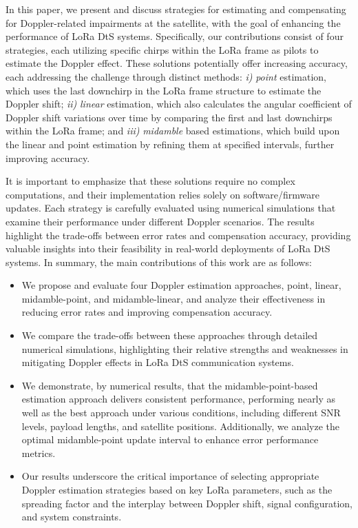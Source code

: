 \documentclass{IEEEtran}
\begin{document}
In this paper, we present and discuss strategies for estimating and compensating for Doppler-related impairments at the satellite, with the goal of enhancing the performance of \ac{LoRa} \ac{DtS} systems. Specifically, our contributions consist of four strategies, each utilizing specific chirps within the \ac{LoRa} frame as pilots to estimate the Doppler effect. These solutions potentially offer increasing accuracy, each addressing the challenge through distinct methods: \textit{i)} \emph{point} estimation, which uses the last downchirp in the \ac{LoRa} frame structure to estimate the Doppler shift; \textit{ii)} \emph{linear} estimation, which also calculates the angular coefficient of Doppler shift variations over time by comparing the first and last  downchirps within the \ac{LoRa} frame; and \textit{iii)} \emph{midamble} based estimations, which build upon the linear and point estimation by refining them at specified intervals, further improving accuracy.

It is important to emphasize that these solutions require no complex computations, and their implementation relies solely on software/firmware updates. Each strategy is carefully evaluated using numerical simulations that examine their performance under different Doppler scenarios. The results highlight the trade-offs between error rates and compensation accuracy, providing valuable insights into their feasibility in real-world deployments of \ac{LoRa} \ac{DtS} systems. In summary, the main contributions of this work are as follows: 
\begin{itemize} 
    \item We propose and evaluate four Doppler estimation approaches, point, linear, midamble-point, and midamble-linear, and analyze their effectiveness in reducing error rates and improving compensation accuracy. 
    \item We compare the trade-offs between these approaches through detailed numerical simulations, highlighting their relative strengths and weaknesses in mitigating Doppler effects in \ac{LoRa} \ac{DtS} communication systems.   
    \item We demonstrate, by numerical results, that the midamble-point-based estimation approach delivers consistent performance, performing nearly as well as the best approach under various conditions, including different SNR levels, payload lengths, and satellite positions. Additionally, we analyze the optimal midamble-point update interval to enhance error performance metrics.
    \item Our results underscore the critical importance of selecting appropriate Doppler estimation strategies based on key \ac{LoRa} parameters, such as the spreading factor and the interplay between Doppler shift, signal configuration, and system constraints.
\end{itemize}
\end{document}
